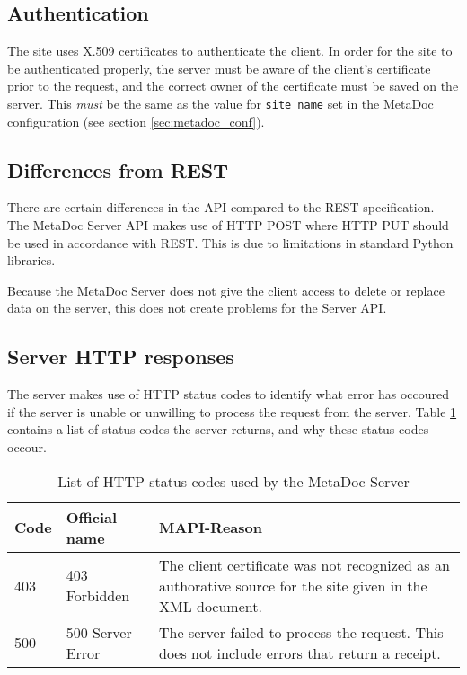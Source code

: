 \subsection{Authentication}
\label{sec:authentication}
The site uses X.509 certificates to authenticate the client. In order for the
site to be authenticated properly, the server must be aware of the client's
certificate prior to the request, and the correct owner of the certificate must
be saved on the server. This \textit{must} be the same as the value for
\texttt{site\_name} set in the MetaDoc configuration (see section
\ref{sec:metadoc_conf}).

\subsection{Differences from REST}
\label{sec:diff_from_rest}

There are certain differences in the API compared to the REST specification. The 
MetaDoc Server API makes use of HTTP POST where HTTP PUT should be used in 
accordance with REST. This is due to limitations in standard Python libraries.

Because the MetaDoc Server does not give the client access to delete or replace
data on the server, this does not create problems for the Server API. %

\subsection{Server HTTP responses}

The server makes use of HTTP status codes to identify what error has occoured
if the server is unable or unwilling to process the request from the server.
Table \ref{tbl:http_status_codes} contains a list of status codes the server
returns, and why these status codes occour. 

\begin{table}[h!]
    \centering
    \caption{List of HTTP status codes used by the MetaDoc Server}
    \begin{tabular}{|l|l|p{7cm}|}
        \hline
        \textbf{Code} & \textbf{Official name} & \textbf{MAPI-Reason} \\
        \hline
        403 & 403 Forbidden & The client certificate was not recognized as an
        authorative source for the site given in the XML document. \\
        \hline
        500 & 500 Server Error & The server failed to process the request. This
        does not include errors that return a receipt. \\
        \hline
    \end{tabular}
    \label{tbl:http_status_codes}
\end{table}
